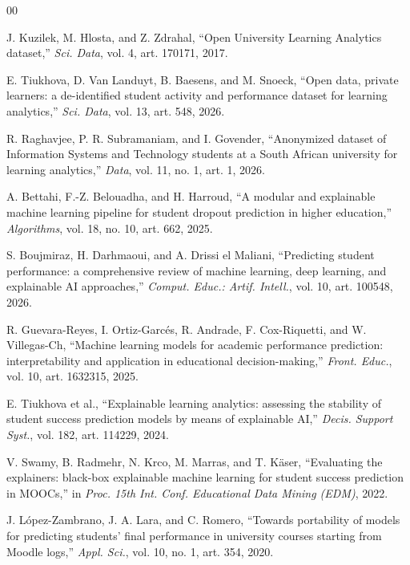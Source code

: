 \documentclass[conference]{IEEEtran}
\begin{document}
\begin{thebibliography}{00}

 J. Kuzilek, M. Hlosta, and Z. Zdrahal, ``Open University
Learning Analytics dataset,'' \emph{Sci. Data}, vol. 4, art. 170171, 2017.

 E. Tiukhova, D. Van Landuyt, B. Baesens, and M. Snoeck,
``Open data, private learners: a de-identified student activity and performance
dataset for learning analytics,'' \emph{Sci. Data}, vol. 13, art. 548, 2026.

 R. Raghavjee, P. R. Subramaniam, and I. Govender,
``Anonymized dataset of Information Systems and Technology students at a South
African university for learning analytics,'' \emph{Data}, vol. 11, no. 1, art. 1,
2026.

 A. Bettahi, F.-Z. Belouadha, and H. Harroud, ``A modular
and explainable machine learning pipeline for student dropout prediction in
higher education,'' \emph{Algorithms}, vol. 18, no. 10, art. 662, 2025.

 S. Boujmiraz, H. Darhmaoui, and A. Drissi el Maliani,
``Predicting student performance: a comprehensive review of machine learning,
deep learning, and explainable AI approaches,'' \emph{Comput. Educ.: Artif.
Intell.}, vol. 10, art. 100548, 2026.

 R. Guevara-Reyes, I. Ortiz-Garc\'es, R. Andrade, F.
Cox-Riquetti, and W. Villegas-Ch, ``Machine learning models for academic
performance prediction: interpretability and application in educational
decision-making,'' \emph{Front. Educ.}, vol. 10, art. 1632315, 2025.

 E. Tiukhova et al., ``Explainable learning analytics:
assessing the stability of student success prediction models by means of
explainable AI,'' \emph{Decis. Support Syst.}, vol. 182, art. 114229, 2024.

 V. Swamy, B. Radmehr, N. Krco, M. Marras, and T. K\"aser,
``Evaluating the explainers: black-box explainable machine learning for student
success prediction in MOOCs,'' in \emph{Proc. 15th Int. Conf. Educational Data
Mining (EDM)}, 2022.

 J. L\'opez-Zambrano, J. A. Lara, and C. Romero, ``Towards
portability of models for predicting students' final performance in university
courses starting from Moodle logs,'' \emph{Appl. Sci.}, vol. 10, no. 1, art. 354,
2020.


\end{thebibliography}
\end{document}
